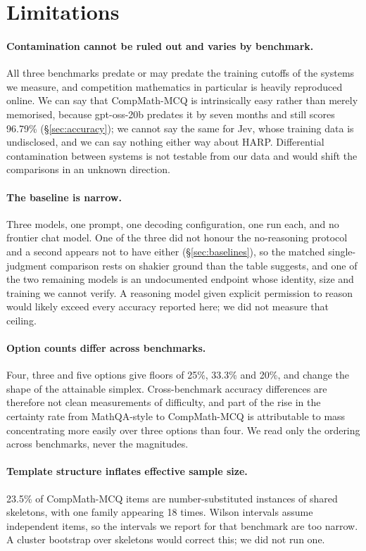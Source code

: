 \documentclass[11pt]{article}
\begin{document}
\section{Limitations}
\label{sec:limitations}

\paragraph{Contamination cannot be ruled out and varies by benchmark.}
All three benchmarks predate or may predate the training cutoffs of the systems we measure, and competition mathematics in particular is heavily reproduced online. We can say that CompMath-MCQ is intrinsically easy rather than merely memorised, because gpt-oss-20b predates it by seven months and still scores 96.79\% (\S\ref{sec:accuracy}); we cannot say the same for Jev, whose training data is undisclosed, and we can say nothing either way about HARP. Differential contamination between systems is not testable from our data and would shift the comparisons in an unknown direction.

\paragraph{The baseline is narrow.}
Three models, one prompt, one decoding configuration, one run each, and no frontier chat model. One of the three did not honour the no-reasoning protocol and a second appears not to have either (\S\ref{sec:baselines}), so the matched single-judgment comparison rests on shakier ground than the table suggests, and one of the two remaining models is an undocumented endpoint whose identity, size and training we cannot verify. A reasoning model given explicit permission to reason would likely exceed every accuracy reported here; we did not measure that ceiling.

\paragraph{Option counts differ across benchmarks.}
Four, three and five options give floors of 25\%, 33.3\% and 20\%, and change the shape of the attainable simplex. Cross-benchmark accuracy differences are therefore not clean measurements of difficulty, and part of the rise in the certainty rate from MathQA-style to CompMath-MCQ is attributable to mass concentrating more easily over three options than four. We read only the ordering across benchmarks, never the magnitudes.

\paragraph{Template structure inflates effective sample size.}
23.5\% of CompMath-MCQ items are number-substituted instances of shared skeletons, with one family appearing 18 times. Wilson intervals assume independent items, so the intervals we report for that benchmark are too narrow. A cluster bootstrap over skeletons would correct this; we did not run one.
\end{document}
